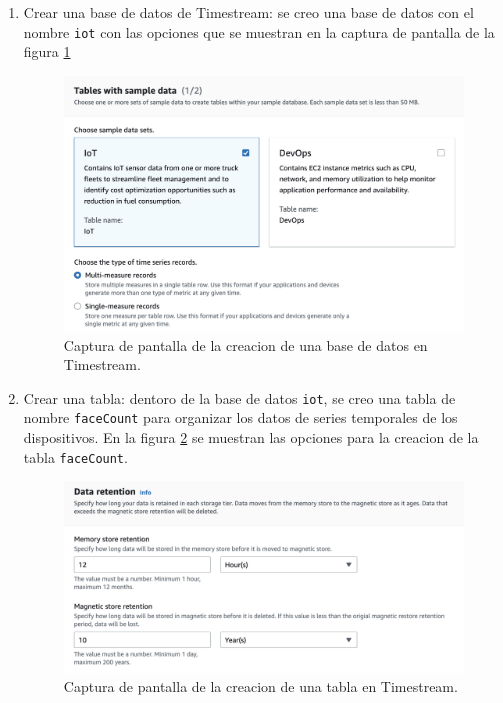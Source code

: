 \begin{enumerate}
	\item Crear una base de datos de Timestream: se creo una base de datos con el nombre \texttt{iot} con las opciones que se muestran en la captura de pantalla de la figura \ref{fig:cc_ts_opt}
	\begin{figure}[h]
		\centering
		\includegraphics[scale=0.45]{./Figures/cc_ts_opt.png}
		\caption{Captura de pantalla de la creacion de una base de datos en Timestream.}
		\label{fig:cc_ts_opt}
	\end{figure}
	
	\item Crear una tabla: dentoro de la base de datos \texttt{iot}, se creo una tabla de nombre \texttt{faceCount} para organizar los datos de series temporales de los dispositivos. En la figura \ref{fig:cc_ts_table} se muestran las opciones para la creacion de la tabla \texttt{faceCount}.
	\begin{figure}[h]
		\centering
		\includegraphics[scale=0.45]{./Figures/cc_ts_table.png}
		\caption{Captura de pantalla de la creacion de una tabla en Timestream.}
		\label{fig:cc_ts_table}
	\end{figure}
	

\end{enumerate}
